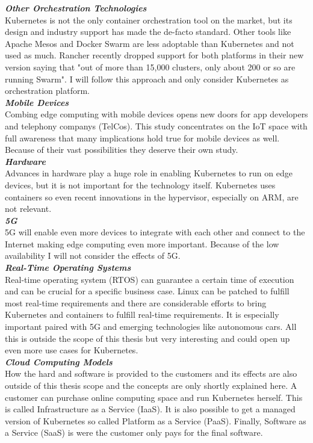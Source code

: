 \textbf{\textit{Other Orchestration Technologies}}\\
Kubernetes is not the only container orchestration tool on the market, but its design and industry support has made the de-facto standard. Other tools like Apache Mesos\cite{ApacheMesos19:online} and Docker Swarm\cite{DockerSwarmmod12:online} are less adoptable than Kubernetes and not used as much. Rancher recently dropped support for both platforms in their new version saying that "out of more than 15,000 clusters, only about 200 or so are running Swarm"\cite{FAQ36RancherSwarmMesos:online}. I will follow this approach and only consider Kubernetes as orchestration platform.\\[5mm]
\textbf{\textit{Mobile Devices}}\\
Combing edge computing with mobile devices opens new doors for app developers and telephony companys (TelCos). This study concentrates on the IoT space with full awareness that many implications hold true for mobile devices as well. Because of their vast possibilities they deserve their own study.\\[5mm]
\textbf{\textit{Hardware}}\\
Advances in hardware play a huge role in enabling Kubernetes to run on edge devices, but it is not important for the technology itself. Kubernetes uses containers so even recent innovations in the hypervisor, especially on ARM, are not relevant.\\[5mm]
\textbf{\textit{5G}}\\
5G will enable even more devices to integrate with each other and connect to the Internet making edge computing even more important. Because of the low availability I will not consider the effects of 5G.\\[5mm]
\textbf{\textit{Real-Time Operating Systems}}\\
Real-time operating system (RTOS) can guarantee a certain time of execution and can be crucial for a specific business case. Linux can be patched to fulfill most real-time requirements and there are considerable efforts to bring Kubernetes and containers to fulfill real-time requirements. It is especially important paired with 5G and emerging technologies like autonomous cars\cite{CNCFLaunRTOSKubernetesContainers40:online}. All this is outside the scope of this thesis but very interesting and could open up even more use cases for Kubernetes.\\[5mm]
\textbf{\textit{Cloud Computing Models}}\\
How the hard and software is provided to the customers and its effects are also outside of this thesis scope and the concepts are only shortly explained here. A customer can purchase online computing space and run Kubernetes herself. This is called Infrastructure as a Service (IaaS). It is also possible to get a managed version of Kubernetes so called Platform as a Service (PaaS). Finally, Software as a Service (SaaS) is were the customer only pays for the final software. 






